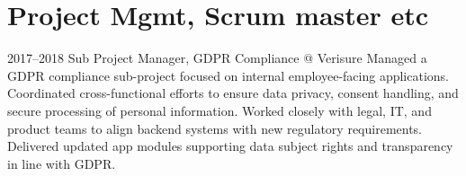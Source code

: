 
\large
\section {Project Mgmt, Scrum master etc}


\cventry
  {2017–2018}
  {Sub Project Manager, GDPR Compliance}
  {@ Verisure}
  {}
  {}
  {Managed a GDPR compliance sub-project focused on internal employee-facing applications. Coordinated cross-functional efforts to ensure data privacy, consent handling, and secure processing of personal information. Worked closely with legal, IT, and product teams to align backend systems with new regulatory requirements. Delivered updated app modules supporting data subject rights and transparency in line with GDPR.}



